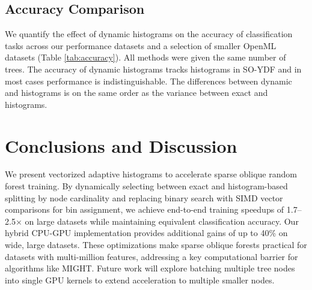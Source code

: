 \documentclass[sigconf,anonymous,review]{acmart}
\begin{document}

%


\subsection{Accuracy Comparison}

We quantify the effect of dynamic histograms on the accuracy of classification tasks across our performance datasets and a selection of smaller OpenML datasets (Table \ref{tab:accuracy}). All methods were given the same number of trees.
The accuracy of dynamic histograms tracks histograms in SO-YDF and in most cases performance is indistinguishable. The differences between dynamic and histograms is on the same order as the variance between exact and histograms.




\section{Conclusions and Discussion}

We present vectorized adaptive histograms to accelerate sparse oblique random forest training. By dynamically selecting between exact and histogram-based splitting by node cardinality and replacing binary search with SIMD vector comparisons for bin assignment, we achieve end-to-end training speedups of 1.7–2.5× on large datasets while maintaining equivalent classification accuracy. Our hybrid CPU-GPU implementation provides additional gains of up to 40\% on wide, large datasets. These optimizations make sparse oblique forests practical for datasets with multi-million features, addressing a key computational barrier for algorithms like MIGHT. Future work will explore batching multiple tree nodes into single GPU kernels to extend acceleration to multiple smaller nodes.



\end{document}
